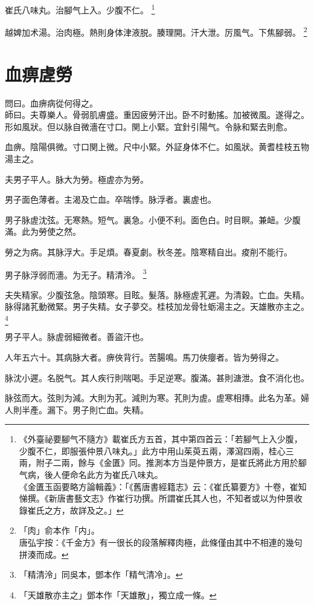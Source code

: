 崔氏八味丸。治腳气上入。少腹不仁。
	\footnote{
		《外臺祕要腳气不隨方》載崔氏方五首，其中第四首云：「若腳气上入少腹，少腹不仁，即服張仲景八味丸。」此方中用山茱萸五兩，澤瀉四兩，桂心三兩，附子二兩，餘与《金匱》同。推測本方当是仲景方，是崔氏將此方用於腳气病，後人便命名此方为崔氏八味丸。\\
		《金匱玉函要略方論輯義》：「《舊唐書經籍志》云：《崔氏纂要方》十卷，崔知悌撰。《新唐書藝文志》作崔行功撰。所謂崔氏其人也，不知者或以为仲景收錄崔氏之方，故詳及之。」
	}

越婢加术湯。治肉極。熱則身体津{\khaaitp 液}脱。腠理開。汗大泄。厉風气。下焦腳弱。
	\footnote{
		「肉」俞本作「内」。\\唐弘宇按：《千金方》有一很长的段落解釋肉極，此條僅由其中不相連的幾句拼湊而成。
	}

\chapter{血痹虗勞}

問曰。血痹病從何得之。\\
師曰。夫尊樂人。骨弱肌膚盛。重因疲勞汗出。卧不时動搖。加被微風。遂得之。{\khaaitp 形如風狀。}但以脉自微濇在寸口。関上小緊。宜針引陽气。令脉和緊去則愈。

血痹。陰陽俱微。寸口関上微。尺中小緊。外証身体不仁。如風狀。黄耆桂枝五物湯主之。

夫男子平人。脉大为勞。極虗亦为勞。

男子面色薄者。主渴及亡血。卒喘悸。脉浮者。裏虗也。

男子脉虗沈弦。无寒熱。短气。裏急。小便不利。面色白。时目瞑。兼衄。少腹滿。此为勞使之然。

勞之为病。其脉浮大。手足煩。春夏劇。秋冬差。陰寒精自出。痠削不能行。

男子脉浮弱而濇。为无子。精清泠。
	\footnote{
		「精清泠」同吳本，鄧本作「精气清冷」。
	}

夫失精家。少腹弦急。陰頭寒。目眩。髮落。脉極虗芤遲。为清穀。亡血。失精。脉得諸芤動微緊。男子失精。女子夢交。桂枝加龙骨牡蛎湯主之。天雄散亦主之。
	\footnote{
		「天雄散亦主之」鄧本作「天雄散」，獨立成一條。
	}

男子平人。脉虗弱細微者。善盜汗也。

人年五六十。其病脉大者。痹俠背行。苦腸鳴。馬刀俠癭者。皆为勞得之。

脉沈小遲。名脱气。其人疾行則喘喝。手足逆寒。腹滿。甚則溏泄。食不消化也。

脉弦而大。弦則为減。大則为芤。減則为寒。芤則为虗。虗寒相摶。此名为革。婦人則半產。漏下。男子則亡血。失精。

